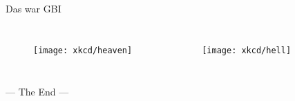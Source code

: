 \begin{frame}{Das war GBI}
	\begin{columns}
		\pause
		\begin{figure}[H]
			\vspace{-20pt}
			\texttt{[image: xkcd/heaven]}
		\end{figure}
	
		\pause
		\begin{figure}[H]
			\vspace{-20pt}
			\texttt{[image: xkcd/hell]}
		\end{figure}
	\end{columns}
\end{frame}

\begin{headframe}
	--- The End ---
\end{headframe}







\backupend
